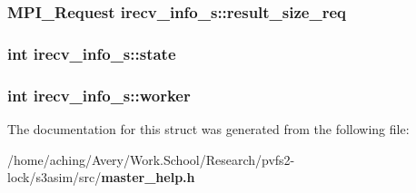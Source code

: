 \subsubsection{\setlength{\rightskip}{0pt plus 5cm}MPI\_\-Request \bf{irecv\_\-info\_\-s::result\_\-size\_\-req}}\label{structirecv__info__s_848d1ec6817ca075691dcd7944bf997c}


\subsubsection{\setlength{\rightskip}{0pt plus 5cm}int \bf{irecv\_\-info\_\-s::state}}\label{structirecv__info__s_161c6aa4a71878c998592de2dc2f0acd}


\subsubsection{\setlength{\rightskip}{0pt plus 5cm}int \bf{irecv\_\-info\_\-s::worker}}\label{structirecv__info__s_497a89b3e99ca6e3328b3d009a8217db}




The documentation for this struct was generated from the following file:\begin{CompactItemize}
\item 
/home/aching/Avery/Work.School/Research/pvfs2-lock/s3asim/src/\bf{master\_\-help.h}\end{CompactItemize}
